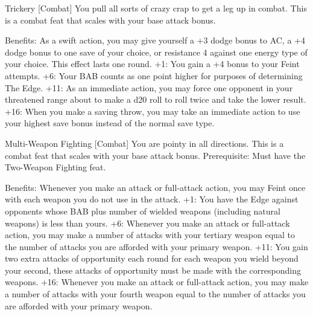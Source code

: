 Trickery [Combat]
You pull all sorts of crazy crap to get a leg up in combat.
This is a combat feat that scales with your base attack bonus.

Benefits: As a swift action, you may give yourself a +3 dodge bonus to AC, a +4 dodge bonus to one save of your choice, or resistance 4 against one energy type of your choice. This effect lasts one round.
+1: You gain a +4 bonus to your Feint attempts.
+6: Your BAB counts as one point higher for purposes of determining The Edge.
+11: As an immediate action, you may force one opponent in your threatened range about to make a d20 roll to roll twice and take the lower result.
+16: When you make a saving throw, you may take an immediate action to use your highest save bonus instead of the normal save type.


Multi-Weapon Fighting [Combat]
You are pointy in all directions.
This is a combat feat that scales with your base attack bonus.
Prerequisite: Must have the Two-Weapon Fighting feat.

Benefits: Whenever you make an attack or full-attack action, you may Feint once with each weapon you do not use in the attack.
+1: You have the Edge against opponents whose BAB plus number of wielded weapons (including natural weapons) is less than yours.
+6: Whenever you make an attack or full-attack action, you may make a number of attacks with your tertiary weapon equal to the number of attacks you are afforded with your primary weapon.
+11: You gain two extra attacks of opportunity each round for each weapon you wield beyond your second, these attacks of opportunity must be made with the corresponding weapons.
+16: Whenever you make an attack or full-attack action, you may make a number of attacks with your fourth weapon equal to the number of attacks you are afforded with your primary weapon.


